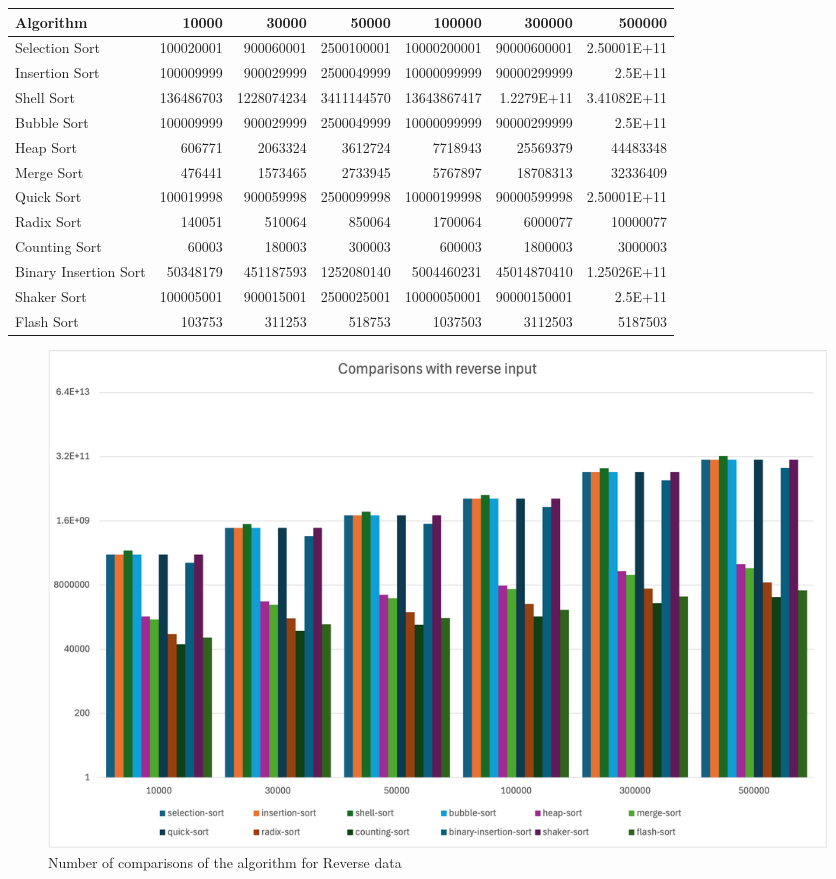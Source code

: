 \begin{table}[h!]
\centering
\begin{tabular}{|l|r|r|r|r|r|r|}
\hline
\textbf{Algorithm} & \textbf{10000} & \textbf{30000} & \textbf{50000} & \textbf{100000} & \textbf{300000} & \textbf{500000} \\
\hline
Selection Sort & 100020001 & 900060001 & 2500100001 & 10000200001 & 90000600001 & 2.50001E+11 \\ \hline
Insertion Sort & 100009999 & 900029999 & 2500049999 & 10000099999 & 90000299999 & 2.5E+11 \\ \hline
Shell Sort & 136486703 & 1228074234 & 3411144570 & 13643867417 & 1.2279E+11 & 3.41082E+11 \\ \hline
Bubble Sort & 100009999 & 900029999 & 2500049999 & 10000099999 & 90000299999 & 2.5E+11 \\ \hline
Heap Sort & 606771 & 2063324 & 3612724 & 7718943 & 25569379 & 44483348 \\ \hline
Merge Sort & 476441 & 1573465 & 2733945 & 5767897 & 18708313 & 32336409 \\ \hline
Quick Sort & 100019998 & 900059998 & 2500099998 & 10000199998 & 90000599998 & 2.50001E+11 \\ \hline
Radix Sort & 140051 & 510064 & 850064 & 1700064 & 6000077 & 10000077 \\ \hline
Counting Sort & 60003 & 180003 & 300003 & 600003 & 1800003 & 3000003 \\ \hline
Binary Insertion Sort & 50348179 & 451187593 & 1252080140 & 5004460231 & 45014870410 & 1.25026E+11 \\ \hline
Shaker Sort & 100005001 & 900015001 & 2500025001 & 10000050001 & 90000150001 & 2.5E+11 \\ \hline
Flash Sort & 103753 & 311253 & 518753 & 1037503 & 3112503 & 5187503 \\
\hline
\end{tabular}
\label{table:reverse_number_of_comparisons}
\end{table}

\begin{figure}[h]
    \centering
    \includegraphics[scale=.65]{Figures/Visualization/Reverse_compare.png}
    \caption{Number of comparisons of the algorithm for Reverse data}
    \label{fig:enter-label}
\end{figure}

